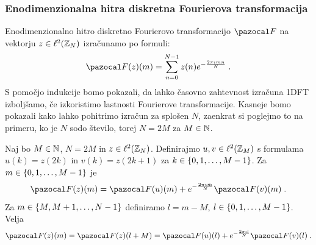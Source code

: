 \subsubsection{Enodimenzionalna hitra diskretna Fourierova transformacija}
%
Enodimenzionalno hitro diskretno Fourierovo transformacijo $\F$ na vektorju $z \in \ell^2(\mathbb Z_N)$ izračunamo po formuli:
%
$$
\F(z)(m) = \sum_{n=0}^{N-1} z(n) e^{-\frac{2\pi\imath mn}{N}} \;.
$$
%
S pomočjo indukcije bomo pokazali, da lahko časovno zahtevnost izračuna 1DFT iz\-bolj\-ša\-mo, če izkoristimo lastnosti Fourierove transformacije. Kasneje bomo pokazali kako lahko pohitrimo izračun za splošen $N$, zaenkrat si poglejmo to na primeru, ko je $N$ sodo število, torej $N = 2M$ za $M \in \mathbb N$.
%
\begin{lema}
Naj bo $M \in \mathbb N$, $N = 2M$ in $z \in \ell^2(\mathbb Z_N)$. Definirajmo $u, v \in \ell^2(\mathbb Z_M)$ s formulama $u(k) = z(2k)$ in $v(k) = z(2k + 1)$ za $k \in \left\{0, 1, \ldots, M-1\right\}$. Za $m \in \left\{0, 1, \ldots, M-1\right\}$ je
\begin{equation}\label{eq:prviD}
  \F(z)(m) = \F(u)(m) + e^{-\frac{2\pi\imath m}{N}}\F(v)(m) \;.
\end{equation}
Za $m \in \left\{M, M+1, \ldots, N-1\right\}$ definiramo $l = m - M$, $l \in \left\{0, 1, \ldots, M-1\right\}$. Velja
\begin{equation}\label{eq:drugiD}
  \F(z)(m) = \F(z)(l + M) = \F(u)(l) + e^{-\frac{2\pi\imath l}{N}}\F(v)(l) \;.
\end{equation}
\end{lema}
%
